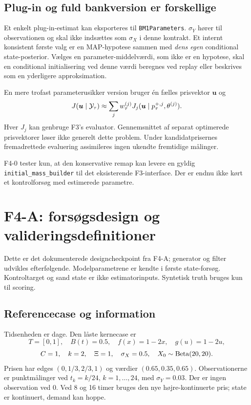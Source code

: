 \subsection{Plug-in og fuld bankversion er forskellige}
Et enkelt plug-in-estimat kan eksporteres til \texttt{BM1Parameters}. \(\sigma_Y\) hører til observationen og skal ikke indsættes som \(\sigma_X\) i denne kontrakt. Et internt konsistent første valg er en MAP-hypotese sammen med \emph{dens egen} conditional state-posterior. Vælges en parameter-middelværdi, som ikke er en hypotese, skal en conditional initialisering ved denne værdi beregnes ved replay eller beskrives som en yderligere approksimation.

En mere trofast parameterusikker version bruger én fælles prisvektor \(\bm u\) og
\begin{equation}
 J(\bm u\mid\mathcal Y_\tau)\approx\sum_jw_\tau^{(j)}
 J_j(\bm u\mid p_\tau^{+,j},\theta^{(j)}).
 \label{eq:handoff}
\end{equation}
Hver \(J_j\) kan genbruge F3's evaluator. Gennemsnittet af separat optimerede prisvektorer løser ikke generelt dette problem. Under kandidatprisernes fremadrettede evaluering assimileres ingen ukendte fremtidige målinger.

F4-0 tester kun, at den konservative remap kan levere en gyldig \texttt{initial\_mass\_builder} til det eksisterende F3-interface. Der er endnu ikke kørt et kontrolforsøg med estimerede parametre.

\section{F4-A: forsøgsdesign og valideringsdefinitioner}
\label{sec:f4a}
Dette er det dokumenterede designcheckpoint fra F4-A; generator og filter udvikles
efterfølgende. Modelparametrene er kendte i første state-forsøg. Kontroltarget og sand
state er ikke estimatorinputs. Syntetisk truth bruges kun til scoring.

\subsection{Referencecase og information}
Tidsenheden er dage. Den låste kernecase er
\[
 T=[0,1],\quad B(t)=0.5,\quad f(x)=1-2x,\quad g(u)=1-2u,
\]
\[
 C=1,\quad k=2,\quad\Xi=1,\quad\sigma_X=0.5,\quad X_0\sim\operatorname{Beta}(20,20).
\]
Prisen har edges \((0,1/3,2/3,1)\) og værdier \((0.65,0.35,0.65)\).
Observationerne er punktmålinger ved \(t_k=k/24\), \(k=1,\ldots,24\), med
\(\sigma_Y=0.03\). Der er ingen observation ved 0. Ved 8 og 16 timer bruges den
nye højre-kontinuerte pris; state er kontinuert, demand kan hoppe.


